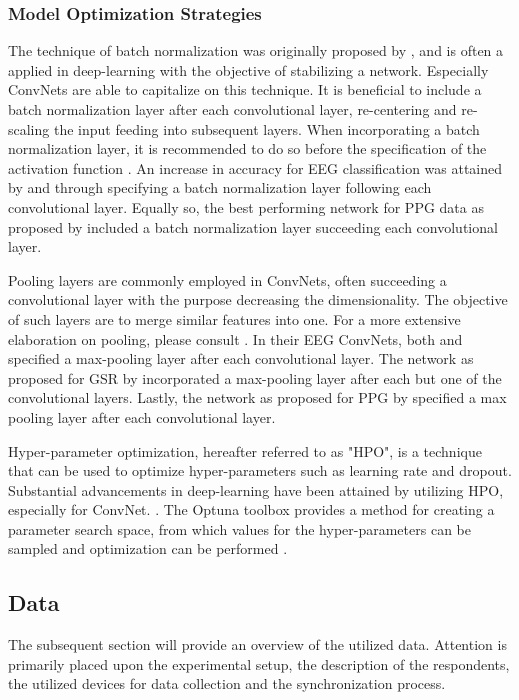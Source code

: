 \documentclass[12pt]{article}
\begin{document}
\subsubsection{Model Optimization Strategies}
The technique of batch normalization was originally proposed by , and is often a applied in deep-learning with the objective of stabilizing a network. Especially ConvNets are able to capitalize on this technique. It is beneficial to include a batch normalization layer after each convolutional layer, re-centering and re-scaling the input feeding into subsequent layers. When incorporating a batch normalization layer, it is recommended to do so before the specification of the activation function \cite{ioffe2015batch}. An increase in accuracy for EEG classification was attained by  and  through specifying a batch normalization layer following each convolutional layer. Equally so, the best performing network for PPG data as proposed by  included a batch normalization layer succeeding each convolutional layer. 

Pooling layers are commonly employed in ConvNets, often succeeding a convolutional layer with the purpose decreasing the dimensionality. The objective of such layers are to merge similar features into one. For a more extensive elaboration on pooling, please consult . In their EEG ConvNets, both  and  specified a max-pooling layer after each convolutional layer. The network as proposed for GSR by  incorporated a max-pooling layer after each but one of the convolutional layers. Lastly, the network as proposed for PPG by \cite{biswas2019cornet} specified a max pooling layer after each convolutional layer. 

Hyper-parameter optimization, hereafter referred to as "HPO", is a technique that can be used to optimize hyper-parameters such as learning rate and dropout. Substantial advancements in deep-learning have been attained by utilizing HPO, especially for ConvNet. \cite{bergstra2012random}. The Optuna toolbox provides a method for creating a parameter search space, from which values for the hyper-parameters can be sampled and optimization can be performed \cite{akiba2019optuna}. 

\subsection{Data}
The subsequent section will provide an overview of the utilized data. Attention is primarily placed upon the experimental setup, the description of the respondents, the utilized devices for data collection and the synchronization process. 
\end{document}

